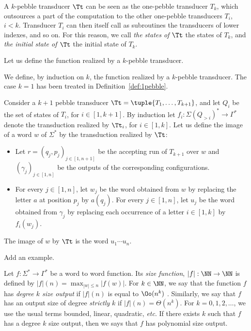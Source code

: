  \medskip
\begin{terminology} 
 A $k$-pebble transducer $\Tt$ can be seen as the one-pebble transducer $T_k$, which outsources a part of the computation to the other one-pebble transducers $T_i$, $i<k$.
 Transducer $T_i$ can then itself call as subroutines the transducers of lower indexes, and so on.
 For this reason, we call \emph{the states of $\Tt$} the states of $T_k$, and \emph{the initial state of $\Tt$} the initial state of $T_k$. 
  \end{terminology}
  
  \smallskip
 Let us define the function realized by a $k$-pebble transducer. 
  
  \begin{definition}
We define, by induction on $k$, the function realized by a $k$-pebble transducer. The case $k=1$ has been treated in Definition~\ref{def:1pebble}. 

Consider a $k+1$ pebble transducer $\Tt=\tuple{T_1,\ldots,T_{k+1}}$, and let $Q_i$ be the set of states of $T_i$, for $i\in [1,k+1]$. By induction let $f_i:\Sigma(Q_{>i})^*\rightarrow \Gamma^*$ denote the transduction realized by $\Tt_i$, for $i\in [1,k]$.
Let us define the image of a word $w$ of $\Sigma^*$ by the transduction realized by $\Tt$:
\begin{itemize}
  \item Let $r=(q_j,p_j)_{j\in[1, n+1]}$ be the accepting run of $T_{k+1}$ over $w$ and $(\gamma_j)_{j\in[1, n]}$ be the outputs of the corresponding configurations.
  
  \item  For every $j\in[1,n]$, let $w_j$ be the word obtained from $w$ by replacing the letter $a$ at position $p_j$ by $a(q_j)$.
      For every $j\in[1,n]$, let $u_j$ be the word obtained from $\gamma_j$ by replacing each occurrence of a letter $i\in [1,k]$ by $f_i(w_j)$.
  
  \end{itemize}
  The image of $w$ by $\Tt$ is the word $u_1\cdots u_n$.
\end{definition}


\begin{example}
  \begin{center}
  Add an example.
  \end{center}
  \end{example}
  

\begin{definition}
  Let $f:\Sigma^*\rightarrow \Gamma^*$ be a word to word function. Its \emph{size function}, $|f|:\NN\rightarrow \NN$ is defined by $|f|(n)=\max_{|w|\leq n}|f(w)|$. For $k\in \NN$, we say that the function $f$ has \emph{degree $k$ size output} if $|f|(n)$ is equal to $\Oo(n^k)$ . Similarly, we say that $f$ has an output size of degree \emph{strictly} $k$ if $|f|(n)=\Theta(n^k)$. For $k=0,1,2,\ldots$, we use the usual terms bounded, linear, quadratic, \textit{etc}.
  If there exists $k$ such that $f$ has a degree $k$ size output, then we says that $f$ has polynomial size output.
  
\end{definition}

